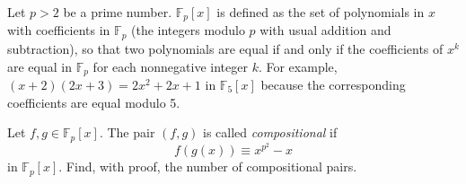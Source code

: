 Let $p > 2$ be a prime number. $\mathbb{F}_p[x]$ is defined as the set of polynomials in $x$ with coefficients in $\mathbb{F}_p$ (the integers modulo $p$ with usual addition and subtraction), so that two polynomials are equal if and only if the coefficients of $x^k$ are equal in $\mathbb{F}_p$ for each nonnegative integer $k$. For example, $(x+2)(2x+3) = 2x^2 + 2x + 1$ in $\mathbb{F}_5[x]$ because the corresponding coefficients are equal modulo 5.

Let $f, g \in \mathbb{F}_p[x]$. The pair $(f, g)$ is called \textit{compositional} if
\[f(g(x)) \equiv x^{p^2} - x\]in $\mathbb{F}_p[x]$. Find, with proof, the number of compositional pairs.
